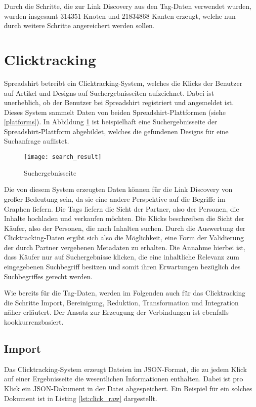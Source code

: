 Durch die Schritte, die zur Link Discovery aus den Tag-Daten verwendet wurden, wurden insgesamt \num{314351} Knoten und \num{21834868} Kanten erzeugt, welche nun durch weitere Schritte angereichert werden sollen.

\section{Clicktracking}
\label{clicktracking}

Spreadshirt betreibt ein Clicktracking-System, welches die Klicks der Benutzer auf Artikel und Designs auf Suchergebnisseiten aufzeichnet. Dabei ist unerheblich, ob der Benutzer bei Spreadshirt registriert und angemeldet ist. Dieses System sammelt Daten von beiden Spreadshirt-Plattformen (siehe \ref{platforms}). In Abbildung \ref{fig:search_result} ist beispielhaft eine Suchergebnisseite der Spreadshirt-Plattform abgebildet, welches die gefundenen Designs für eine Suchanfrage auflistet.

\begin{figure}
\centering
\texttt{[image: search\_result]}
\caption{Suchergebnisseite}
\label{fig:search_result}
\end{figure}

Die von diesem System erzeugten Daten können für die Link Discovery von großer Bedeutung sein, da sie eine andere Perspektive auf die Begriffe im Graphen liefern. Die Tags liefern die Sicht der Partner, also der Personen, die Inhalte hochladen und verkaufen möchten. Die Klicks beschreiben die Sicht der Käufer, also der Personen, die nach Inhalten suchen. Durch die Auswertung der Clicktracking-Daten ergibt sich also die Möglichkeit, eine Form der Validierung der durch Partner vergebenen Metadaten zu erhalten. Die Annahme hierbei ist, dass Käufer nur auf Suchergebnisse klicken, die eine inhaltliche Relevanz zum eingegebenen Suchbegriff besitzen und somit ihren Erwartungen bezüglich des Suchbegriffes gerecht werden.

Wie bereits für die Tag-Daten, werden im Folgenden auch für das Clicktracking die Schritte Import, Bereinigung, Reduktion, Transformation und Integration näher erläutert. Der Ansatz zur Erzeugung der Verbindungen ist ebenfalls kookkurrenzbasiert.

\subsection{Import}
\label{click_import}

Das Clicktracking-System erzeugt Dateien im JSON-Format, die zu jedem Klick auf einer Ergebnisseite die wesentlichen Informationen enthalten. Dabei ist pro Klick ein JSON-Dokument in der Datei abgespeichert. Ein Beispiel für ein solches Dokument ist in Listing \ref{lst:click_raw} dargestellt.


